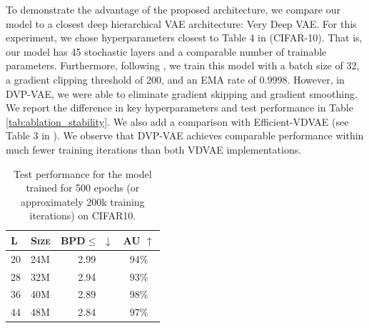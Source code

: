 To demonstrate the advantage of the proposed architecture, we compare our model to a closest deep hierarchical VAE architecture: Very Deep VAE. For this experiment, we chose hyperparameters closest to Table 4 in \citet{Child2020-ze} (CIFAR-10). That is, our model has 45 stochastic layers and a comparable number of trainable parameters. Furthermore, following \citet{Child2020-ze}, we train this model with a batch size of 32, a gradient clipping threshold of 200, and an EMA rate of 0.9998. 
However, in DVP-VAE, we were able to eliminate gradient skipping and gradient smoothing. 
We report the difference in key hyperparameters and test performance in Table \ref{tab:ablation_stability}. We also add a comparison with Efficient-VDVAE (see Table 3 in \citet{hazami2022efficientvdvae}).
We observe that DVP-VAE achieves comparable performance within much fewer training iterations than both VDVAE implementations. 

\begin{table}[t]
    \centering
    \caption{Test performance for the model trained for 500 epochs (or approximately 200k training iterations) on CIFAR10.}    \label{tab:increase_num_layers}
    \begin{tabular}{ll|cc}
        \toprule
         \textsc{L} & \textsc{Size} & \textsc{BPD}$\leq$ $\downarrow$ & \textsc{AU} $\uparrow$\\
        \midrule
        20 & 24M & 2.99 & 94\%\\
        28 & 32M & 2.94 & 93\% \\
        36 & 40M & 2.89 & 98\%\\
        44 & 48M & 2.84 & 97\%\\
        \bottomrule
    \end{tabular}
    \vskip 25pt
\end{table}

